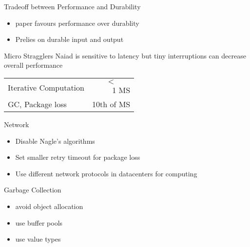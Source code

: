  \begin{frame}[t]{}
  \vspace{0.15cm}
Tradeoff between Performance and Durability
   \begin{itemize}\setlength\itemsep{0.25cm}
     \item paper favours performance over durablity
     \item Prelies on durable input and output
   \end{itemize}

\end{frame}

 \begin{frame}[t]{Micro Stragglers}
  \vspace{0.15cm}
Naiad is sensitive to latency but tiny interruptions can decrease overall performance  

\begin{tabular}{ l r }
  Iterative Computation & $$<$$ 1 MS \\
  GC, Package loss   & 10th of MS \\
\end{tabular}

Network

\begin{itemize}\setlength\itemsep{0.25cm}
\item Disable Nagle's algorithms
\item Set smaller retry timeout for package loss
\item Use different network protocols in datacenters for computing
\end{itemize}

Garbage Collection

\begin{itemize}\setlength\itemsep{0.25cm}
\item avoid object allocation
\item use buffer pools
\item use value types
\end{itemize}

\end{frame}

